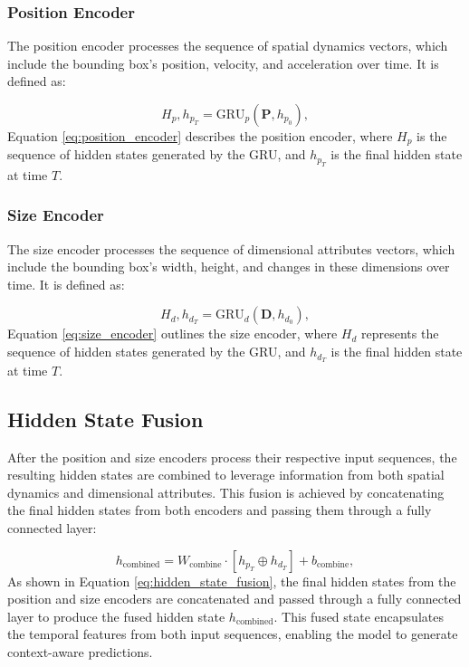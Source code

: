 \documentclass[12pt,oneside]{book} %
\begin{document}
\subsubsection*{Position Encoder}
\noindent The position encoder processes the sequence of spatial dynamics vectors, which include the bounding box’s position, velocity, and acceleration over time. It is defined as:

\begin{equation}
    H_p, h_{p_T} = \text{GRU}_p(\mathbf{P}, h_{p_0}), \label{eq:position_encoder}
\end{equation}
Equation \eqref{eq:position_encoder} describes the position encoder, where $H_p$
is the sequence of hidden states generated by the GRU, and $h_{p_T}$ is the
final hidden state at time $T$.

\subsubsection*{Size Encoder}
\noindent The size encoder processes the sequence of dimensional attributes vectors, which include the bounding box’s width, height, and changes in these dimensions over time. It is defined as:

\begin{equation}
    H_d, h_{d_T} = \text{GRU}_d(\mathbf{D}, h_{d_0}), \label{eq:size_encoder}
\end{equation}
Equation \eqref{eq:size_encoder} outlines the size encoder, where $H_d$
represents the sequence of hidden states generated by the GRU, and $h_{d_T}$ is
the final hidden state at time $T$.

\subsection{Hidden State Fusion}
\noindent After the position and size encoders process their respective input sequences, the resulting hidden states are combined to leverage information from both spatial dynamics and dimensional attributes. This fusion is achieved by concatenating the final hidden states from both encoders and passing them through a fully connected layer:

\begin{equation}
    h_{\text{combined}} = W_{\text{combine}} \cdot \left[h_{p_T} \oplus h_{d_T}\right] + b_{\text{combine}}, \label{eq:hidden_state_fusion}
\end{equation}
As shown in Equation \eqref{eq:hidden_state_fusion}, the final hidden states from
the position and size encoders are concatenated and passed through a fully
connected layer to produce the fused hidden state $h_{\text{combined}}$. This
fused state encapsulates the temporal features from both input sequences,
enabling the model to generate context-aware predictions. 
\end{document}
